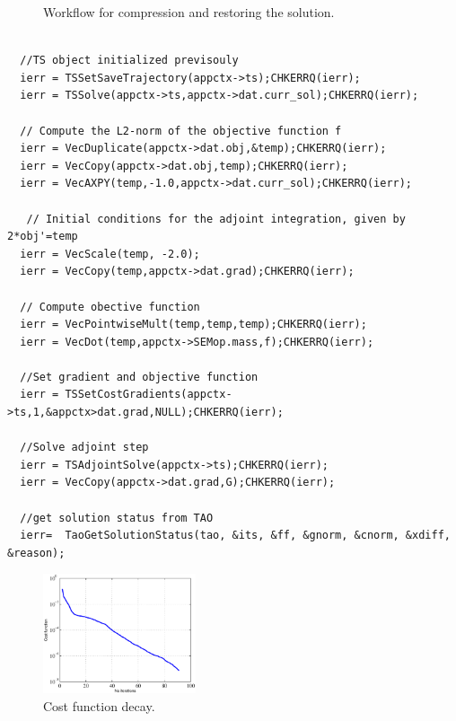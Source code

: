 \documentclass[10pt]{article}
\begin{document}
\begin{figure}
\begin{center}
\end{center}
 \caption{Workflow for compression and restoring the solution.} 
  \label{fig:algorithm}
\end{figure}
\lstset{language=C,numbers=left,
    stepnumber=5,
    showstringspaces=false,
    tabsize=2,
    breaklines=true,
    breakatwhitespace=true}
\begin{lstlisting}[caption=PETSc code for PDE constrained optimization via adjoints, label=codemat]

  //TS object initialized previsouly
  ierr = TSSetSaveTrajectory(appctx->ts);CHKERRQ(ierr);
  ierr = TSSolve(appctx->ts,appctx->dat.curr_sol);CHKERRQ(ierr);
  
  // Compute the L2-norm of the objective function f
  ierr = VecDuplicate(appctx->dat.obj,&temp);CHKERRQ(ierr);
  ierr = VecCopy(appctx->dat.obj,temp);CHKERRQ(ierr);
  ierr = VecAXPY(temp,-1.0,appctx->dat.curr_sol);CHKERRQ(ierr);
  
   // Initial conditions for the adjoint integration, given by 2*obj'=temp    
  ierr = VecScale(temp, -2.0);
  ierr = VecCopy(temp,appctx->dat.grad);CHKERRQ(ierr);
  
  // Compute obective function
  ierr = VecPointwiseMult(temp,temp,temp);CHKERRQ(ierr);
  ierr = VecDot(temp,appctx->SEMop.mass,f);CHKERRQ(ierr);
  
  //Set gradient and objective function
  ierr = TSSetCostGradients(appctx->ts,1,&appctx>dat.grad,NULL);CHKERRQ(ierr);
       
  //Solve adjoint step
  ierr = TSAdjointSolve(appctx->ts);CHKERRQ(ierr);
  ierr = VecCopy(appctx->dat.grad,G);CHKERRQ(ierr);
  
  //get solution status from TAO
  ierr=  TaoGetSolutionStatus(tao, &its, &ff, &gnorm, &cnorm, &xdiff, &reason);
\end{lstlisting}
\begin{figure}[!ht]
\centering
\includegraphics[width=0.4\textwidth]{Cost_decay.eps}
\caption{Cost function decay.}
\label{fig:decay_cd}
\end{figure}
\end{document}
